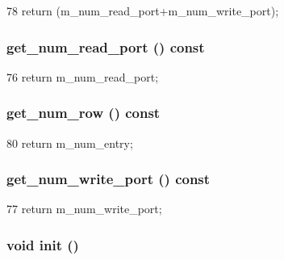 \begin{DoxyCode}
78 { return (m_num_read_port+m_num_write_port); }
\end{DoxyCode}
\hypertarget{classSRAM_a1f89e3f79d1f83f22d8e03f7a132242f}{
\subsubsection[{get\_\-num\_\-read\_\-port}]{ get\_\-num\_\-read\_\-port () const}}
\label{classSRAM_a1f89e3f79d1f83f22d8e03f7a132242f}



\begin{DoxyCode}
76 { return m_num_read_port; }
\end{DoxyCode}
\hypertarget{classSRAM_a870b30e2a9145eeda64c820e9f43c74e}{
\subsubsection[{get\_\-num\_\-row}]{ get\_\-num\_\-row () const}}
\label{classSRAM_a870b30e2a9145eeda64c820e9f43c74e}



\begin{DoxyCode}
80 { return m_num_entry; }
\end{DoxyCode}
\hypertarget{classSRAM_ae9eea5ec891e765e6bdb63618ba3181a}{
\subsubsection[{get\_\-num\_\-write\_\-port}]{ get\_\-num\_\-write\_\-port () const}}
\label{classSRAM_ae9eea5ec891e765e6bdb63618ba3181a}



\begin{DoxyCode}
77 { return m_num_write_port; }
\end{DoxyCode}
\hypertarget{classSRAM_a02fd73d861ef2e4aabb38c0c9ff82947}{
\subsubsection[{init}]{\setlength{\rightskip}{0pt plus 5cm}void init ()}}
\label{classSRAM_a02fd73d861ef2e4aabb38c0c9ff82947}



